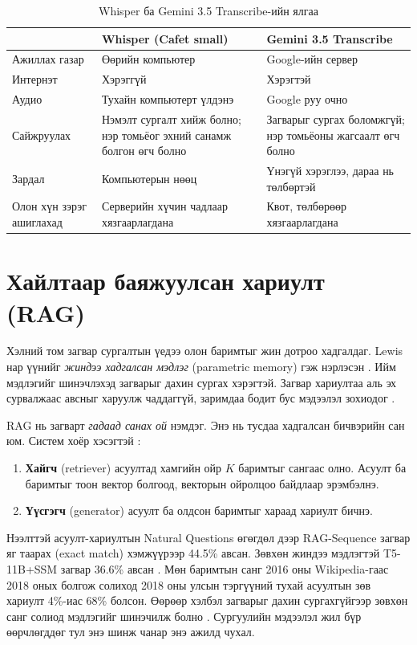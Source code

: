\begin{table}[ht]
\centering
\caption{Whisper ба Gemini 3.5 Transcribe-ийн ялгаа}
\label{tab:asr_compare}
\begin{tabular}{|p{3.6cm}|p{5.0cm}|p{5.0cm}|}
\hline
 & \textbf{Whisper (Cafet small)} & \textbf{Gemini 3.5 Transcribe} \\
\hline
Ажиллах газар & Өөрийн компьютер & Google-ийн сервер \\
\hline
Интернэт & Хэрэггүй & Хэрэгтэй \\
\hline
Аудио & Тухайн компьютерт үлдэнэ & Google руу очно \\
\hline
Сайжруулах & Нэмэлт сургалт хийж болно; нэр томьёог эхний санамж болгон өгч болно \cite{openai_whisper_repo} & Загварыг сургах боломжгүй; нэр томьёоны жагсаалт өгч болно \\
\hline
Зардал & Компьютерын нөөц & Үнэгүй хэрэглээ, дараа нь төлбөртэй \\
\hline
Олон хүн зэрэг ашиглахад & Серверийн хүчин чадлаар хязгаарлагдана & Квот, төлбөрөөр хязгаарлагдана \\
\hline
\end{tabular}
\end{table}

\section{Хайлтаар баяжуулсан хариулт (RAG)}
\label{sec:lit-rag}

Хэлний том загвар сургалтын үедээ олон баримтыг жин дотроо хадгалдаг. Lewis нар үүнийг \textit{жиндээ хадгалсан мэдлэг} (parametric memory) гэж нэрлэсэн \cite{lewis2020rag}. Ийм мэдлэгийг шинэчлэхэд загварыг дахин сургах хэрэгтэй. Загвар хариултаа аль эх сурвалжаас авсныг харуулж чаддаггүй, заримдаа бодит бус мэдээлэл зохиодог \cite{lewis2020rag}.

RAG нь загварт \textit{гадаад санах ой} нэмдэг. Энэ нь тусдаа хадгалсан бичвэрийн сан юм. Систем хоёр хэсэгтэй \cite{lewis2020rag}:
\begin{enumerate}
    \item \textbf{Хайгч} (retriever) асуултад хамгийн ойр $K$ баримтыг сангаас олно. Асуулт ба баримтыг тоон вектор болгоод, векторын ойролцоо байдлаар эрэмбэлнэ.
    \item \textbf{Үүсгэгч} (generator) асуулт ба олдсон баримтыг хараад хариулт бичнэ.
\end{enumerate}
Нээлттэй асуулт-хариултын Natural Questions өгөгдөл дээр RAG-Sequence загвар яг таарах (exact match) хэмжүүрээр 44.5\% авсан. Зөвхөн жиндээ мэдлэгтэй T5-11B+SSM загвар 36.6\% авсан \cite{lewis2020rag}. Мөн баримтын санг 2016 оны Wikipedia-гаас 2018 оных болгож солиход 2018 оны улсын тэргүүний тухай асуултын зөв хариулт 4\%-иас 68\% болсон. Өөрөөр хэлбэл загварыг дахин сургахгүйгээр зөвхөн санг солиод мэдлэгийг шинэчилж болно \cite{lewis2020rag}. Сургуулийн мэдээлэл жил бүр өөрчлөгддөг тул энэ шинж чанар энэ ажилд чухал.

